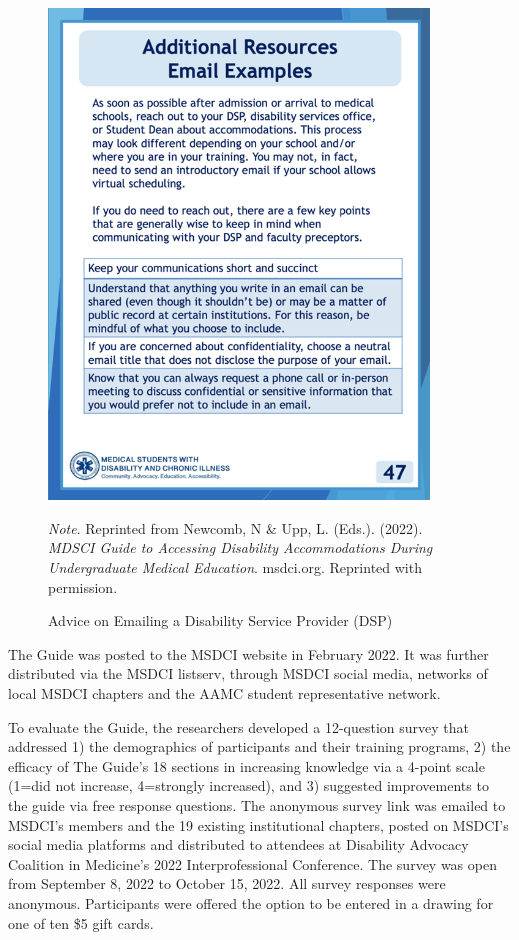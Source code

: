 \documentclass[11.5pt]{sig-alternate} %
\begin{document}
\begin{large}
\begin{figure}[htbp]
    \centering
    \includegraphics[width=0.9\textwidth]{images/fig3.png}
    \caption{Advice on Emailing a Disability Service Provider (DSP)}
    \label{Figure 3}
    \justifying
    \textit{Note}. Reprinted from Newcomb, N  \&  Upp, L. (Eds.). (2022). \textit{MDSCI Guide to Accessing Disability Accommodations During Undergraduate Medical Education}. msdci.org. Reprinted with permission.
\end{figure}

The Guide was posted to the MSDCI website in February 2022. It was further distributed via the MSDCI listserv, through MSDCI social media, networks of local MSDCI chapters and the AAMC student representative network. 

To evaluate the Guide, the researchers developed a 12-question survey that addressed 1) the demographics of participants and their training programs, 2) the efficacy of The Guide’s 18 sections in increasing knowledge via a 4-point scale (1=did not increase, 4=strongly increased), and 3) suggested improvements to the guide via free response questions. The anonymous survey link was emailed to MSDCI’s members and the 19 existing institutional chapters, posted on MSDCI’s social media platforms and distributed to attendees at Disability Advocacy Coalition in Medicine's 2022 Interprofessional Conference.  The survey was open from September 8, 2022 to October 15, 2022. All survey responses were anonymous. Participants were offered the option to be entered in a drawing for one of ten \$5 gift cards.


\end{large}
\end{document}
